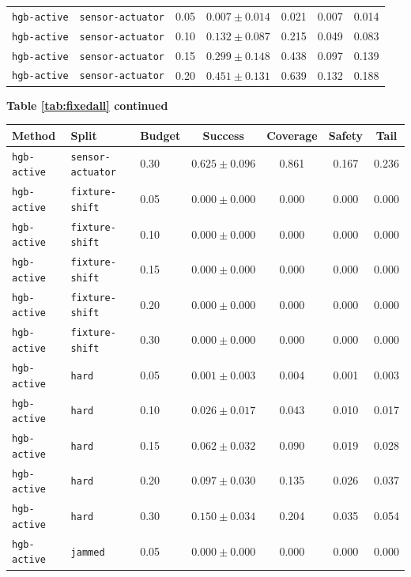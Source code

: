 \documentclass{article}
\begin{document}
\begin{center}
\begin{tabular}{lllcccc}
\texttt{hgb-active} & \texttt{sensor-actuator} & 0.05 & $0.007 \pm 0.014$ & 0.021 & 0.007 & 0.014 \\
\texttt{hgb-active} & \texttt{sensor-actuator} & 0.10 & $0.132 \pm 0.087$ & 0.215 & 0.049 & 0.083 \\
\texttt{hgb-active} & \texttt{sensor-actuator} & 0.15 & $0.299 \pm 0.148$ & 0.438 & 0.097 & 0.139 \\
\texttt{hgb-active} & \texttt{sensor-actuator} & 0.20 & $0.451 \pm 0.131$ & 0.639 & 0.132 & 0.188 \\
\bottomrule
\end{tabular}
\end{center}
\begin{center}
\textbf{Table \ref{tab:fixedall} continued}\\[0.4ex]
\begin{tabular}{lllcccc}
\toprule
Method & Split & Budget & Success & Coverage & Safety & Tail \\
\midrule
\texttt{hgb-active} & \texttt{sensor-actuator} & 0.30 & $0.625 \pm 0.096$ & 0.861 & 0.167 & 0.236 \\
\texttt{hgb-active} & \texttt{fixture-shift} & 0.05 & $0.000 \pm 0.000$ & 0.000 & 0.000 & 0.000 \\
\texttt{hgb-active} & \texttt{fixture-shift} & 0.10 & $0.000 \pm 0.000$ & 0.000 & 0.000 & 0.000 \\
\texttt{hgb-active} & \texttt{fixture-shift} & 0.15 & $0.000 \pm 0.000$ & 0.000 & 0.000 & 0.000 \\
\texttt{hgb-active} & \texttt{fixture-shift} & 0.20 & $0.000 \pm 0.000$ & 0.000 & 0.000 & 0.000 \\
\texttt{hgb-active} & \texttt{fixture-shift} & 0.30 & $0.000 \pm 0.000$ & 0.000 & 0.000 & 0.000 \\
\texttt{hgb-active} & \texttt{hard} & 0.05 & $0.001 \pm 0.003$ & 0.004 & 0.001 & 0.003 \\
\texttt{hgb-active} & \texttt{hard} & 0.10 & $0.026 \pm 0.017$ & 0.043 & 0.010 & 0.017 \\
\texttt{hgb-active} & \texttt{hard} & 0.15 & $0.062 \pm 0.032$ & 0.090 & 0.019 & 0.028 \\
\texttt{hgb-active} & \texttt{hard} & 0.20 & $0.097 \pm 0.030$ & 0.135 & 0.026 & 0.037 \\
\texttt{hgb-active} & \texttt{hard} & 0.30 & $0.150 \pm 0.034$ & 0.204 & 0.035 & 0.054 \\
\texttt{hgb-active} & \texttt{jammed} & 0.05 & $0.000 \pm 0.000$ & 0.000 & 0.000 & 0.000 \\

\end{tabular}
\end{center}
\end{document}
